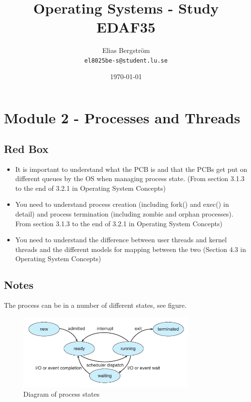 \documentclass{article}
\title{\Huge Operating Systems - Study \\ EDAF35}
\author{  
    Elias Bergström\\
    \texttt{el8025be-s@student.lu.se}
    }
\date{\today}
\begin{document}
\maketitle
\thispagestyle{empty}
\pagebreak



\pagebreak


\section{Module 2 - Processes and Threads}
\subsection{Red Box}
\begin{itemize}
    \item It is important to understand what the PCB is and that the PCBs get put on different queues by the OS when
    managing process state.
    (From section 3.1.3 to the end of 3.2.1 in Operating System Concepts)
    \item You need to understand process creation (including fork() and exec() in detail) and process termination (including
    zombie and orphan processes). From section 3.1.3 to the end of 3.2.1 in Operating System Concepts)
    \item You need to understand the difference between user threads and kernel threads and the different models for
    mapping between the two (Section 4.3 in Operating System Concepts)
\end{itemize}

\subsection{Notes}



The process can be in a number of different states, see figure.

\begin{figure}[H]
    \centering
    \includegraphics[width=0.8\textwidth]{pcb.png}
    \caption{Diagram of process states}
    \label{fig:diapcb}
\end{figure}
\end{document}
